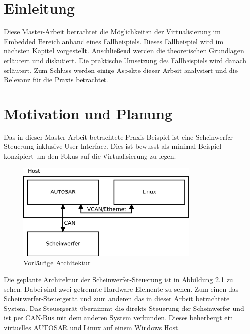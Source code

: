 \documentclass[
  a4paper,					    %
  twoside,
  DIV=calc,     				%
  bibliography=totoc,
  cleardoublepage=empty,
  ngerman,     					%
  final       					%
]{scrbook}
\begin{document}
\mainmatter
\chapter{Einleitung}
\label{sec:Einleitung}
Diese Master-Arbeit betrachtet die Möglichkeiten der Virtualisierung im Embedded Bereich anhand eines Fallbeispiels. Dieses Fallbeispiel wird im nächsten Kapitel vorgestellt. Anschließend werden die theoretischen Grundlagen erläutert und diskutiert. Die praktische Umsetzung des Fallbeispiels wird danach erläutert. Zum Schluss werden einige Aspekte dieser Arbeit analysiert und die Relevanz für die Praxis betrachtet.





\chapter{Motivation und Planung}
\label{sec:MotivationPlanung}
Das in dieser Master-Arbeit betrachtete Praxis-Beispiel ist eine Scheinwerfer-Steuerung inklusive User-Interface. Dies ist bewusst als minimal Beispiel konzipiert um den Fokus auf die Virtualisierung zu legen.

\begin{figure}[ht]
\centering
\includegraphics[width=0.8\textwidth]{arch_begin.png}
\caption{Vorläufige Architektur}
\label{fig:arch_begin}
\end{figure}

Die geplante Architektur der Scheinwerfer-Steuerung ist in Abbildung \ref{fig:arch_begin} zu sehen. Dabei sind zwei getrennte Hardware Elemente zu sehen. Zum einen das Scheinwerfer-Steuergerät und zum anderen das in dieser Arbeit betrachtete System. Das Steuergerät übernimmt die direkte Steuerung der Scheinwerfer und ist per CAN-Bus mit dem anderen System verbunden.  Dieses beherbergt ein virtuelles AUTOSAR und Linux auf einem Windows Host.
\end{document}
